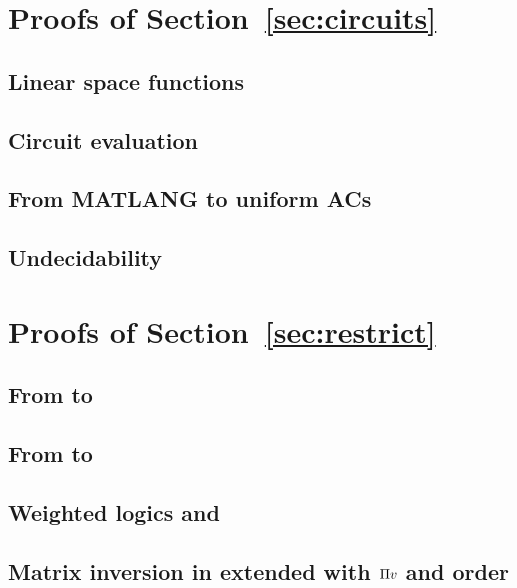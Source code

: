 \section{Proofs of Section~\ref{sec:circuits}}

% 

\subsection{Linear space functions}


\subsection{Circuit evaluation}


\subsection{From MATLANG to uniform ACs}


\subsection{Undecidability}



\section{Proofs of Section~\ref{sec:restrict}}

\subsection{From \langsum to \rak}


\subsection{From \rak to \langsum}


%

% 

\subsection{Weighted logics and \langprod}


\subsection{Matrix inversion in \langsum extended with $\Pi v$ and order}\label{app:asset_order}

